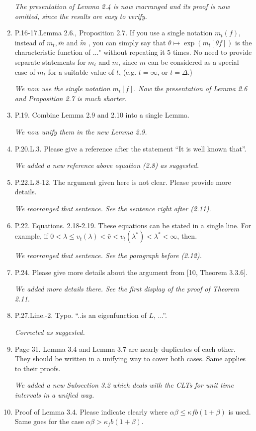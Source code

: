 \documentclass[12pt,a4paper]{amsart}
\begin{document}
\begin{enumerate}
  \emph{The presentation of Lemma 2.4 is now rearranged and its proof is now omitted, since the results are easy to verify.}
\item
  P.16-17.Lemma 2.6., Proposition 2.7.
  If you use a single notation $m_t(f)$, instead of $m_t, \bar m$ and $\tilde m$ , you can simply say that $\theta \mapsto \exp(m_t[\theta f])$ is the characteristic function of ..." without repeating it 5 times.
  No need to provide separate statements for $m_t$ and $m$, since $m$ can be considered as a special case of $m_t$ for a suitable value of $t$, (e.g. $t = \infty$, or $t = \Delta$.)

  \emph{We now use the single notation $m_t[f]$. Now the presentation of Lemma 2.6 and Proposition 2.7 is much shorter.}
\item
  P.19.
  Combine Lemma 2.9 and 2.10 into a single Lemma.

  \emph{We now unify them in the new Lemma 2.9.}
\item
  P.20.L.3.
  Please give a reference after the statement ``It is well known that''.

  \emph{We added a new reference above equation (2.8) as suggested.}
\item
  P.22.L.8-12.
  The argument given here is not clear.
  Please provide more details.

  \emph{We rearranged that sentence. See the sentence right after (2.11).}
\item
  P.22. Equations. 2.18-2.19.
  These equations can be stated in a single line.
  For example, if $0< \lambda \leq v_t(\lambda) < \bar v < v_t(\lambda^*)<\lambda^* < \infty$, then.

  \emph{We rearranged that sentence. 
See the paragraph before (2.12).}

\item
  P.24.
  Please give more details about the argument from [10, Theorem 3.3.6].

  \emph{We added more details there. 
    See the first display of the proof of Theorem 2.11.}

\item
  P.27.Line.-2.
  Typo. ``..is an eigenfunction of $L$, ...''.

  \emph{Corrected as suggested.}
\item
  Page 31. Lemma 3.4 and Lemma 3.7 are nearly duplicates of each other.
  They should be written in a unifying way to cover both cases. Same applies to their proofs.

  \emph{We added a new Subsection 3.2 which deals with the CLTs for unit time intervals in a unified way.}
\item
  Proof of Lemma 3.4. Please indicate clearly where $\alpha \beta \leq \kappa f b(1 + \beta)$ is used.
  Same goes for the case $\alpha \beta > \kappa_f b(1 + \beta)$.


\end{enumerate}
\end{document}
